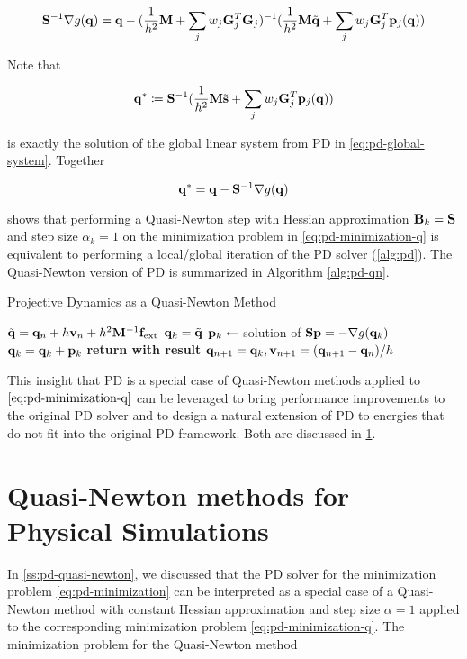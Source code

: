 \[
    \mathbf{S}^{-1} \nabla g(\mathbf{q}) = 
    \mathbf{q} - (\frac{1}{h^2}\mathbf{M} + \sum_j w_j \mathbf{G}_j^T \mathbf{G}_j)^{-1} 
    (\frac{1}{h^2}\mathbf{M}\tilde{\mathbf{q}} + \sum_j w_j \mathbf{G}_j^T \mathbf{p}_j(\mathbf{q}))
\]

\noindent Note that 

\[
    \mathbf{q}^* \coloneqq \mathbf{S}^{-1} (\frac{1}{h^2}\mathbf{M}\tilde{\mathbf{s}} + \sum_j w_j 
    \mathbf{G}_j^T \mathbf{p}_j(\mathbf{q}))
\]

\noindent is exactly the solution of the global linear system from PD in \autoref{eq:pd-global-system}. Together

\[
    \mathbf{q}^* = \mathbf{q} -\mathbf{S}^{-1} \nabla g(\mathbf{q}) 
\]

\noindent shows that performing a Quasi-Newton step with Hessian approximation $\mathbf{B}_k = \mathbf{S}$ and step size 
$\alpha_k = 1$ on the 
minimization problem in \autoref{eq:pd-minimization-q} is equivalent to performing a local/global iteration of the PD solver 
(\cref{alg:pd}). The Quasi-Newton version of PD is summarized in Algorithm \ref{alg:pd-qn}.

\begin{algorithm}
\caption{Projective Dynamics as a Quasi-Newton Method}\label{alg:pd-qn}
\begin{algorithmic}
\State $\tilde{\mathbf{q}} = \mathbf{q}_n + h\mathbf{v}_n + h^2\mathbf{M}^{-1}\mathbf{f}_{\text{ext}}$
\State $\mathbf{q}_k = \tilde{\mathbf{q}}$
\State $\mathbf{p}_k \gets$ solution of $\mathbf{S}\mathbf{p} = -\nabla g(\mathbf{q}_k)$
\State $\mathbf{q}_k = \mathbf{q}_k + \mathbf{p}_k$
\EndFor
\State \textbf{return with result } $\mathbf{q}_{n+1} = \mathbf{q}_k, \mathbf{v}_{n+1} = (\mathbf{q}_{n+1} - \mathbf{q}_n)/h$
\EndProcedure
\end{algorithmic}
\end{algorithm}

This insight that PD is a special case of Quasi-Newton methods applied to $\autoref{eq:pd-minimization-q}$ can be leveraged to
bring performance improvements to the original PD solver and to design a natural extension of PD to energies that do not fit 
into the original PD framework. Both are discussed in \cref{s:qn-rts}.

\section{Quasi-Newton methods for Physical Simulations}\label{s:qn-rts}
In \cref{ss:pd-quasi-newton}, we discussed that the PD solver for the minimization problem \autoref{eq:pd-minimization}
can be interpreted as a special case of a Quasi-Newton method with constant Hessian approximation and step size $\alpha = 1$
applied to the corresponding minimization problem \autoref{eq:pd-minimization-q}. The minimization problem for the Quasi-Newton
method

